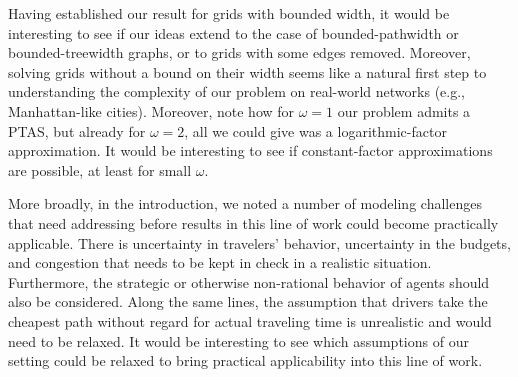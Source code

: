 Having established our result for grids with bounded width, it would be interesting to see if our ideas extend to the case of bounded-pathwidth or bounded-treewidth graphs, or to grids with some edges removed. Moreover, solving grids without a bound on their width seems like a natural first step to understanding the complexity of our problem on real-world networks (e.g., Manhattan-like cities). Moreover, note how for $\omega = 1$ our problem admits a PTAS, but already for $\omega = 2$, all we could give was a logarithmic-factor approximation. It would be interesting to see if constant-factor approximations are possible, at least for small $\omega$.

More broadly, in the introduction, we noted a number of modeling challenges that need addressing before results in this line of work could become practically applicable. There is uncertainty in travelers' behavior, uncertainty in the budgets, and congestion that needs to be kept in check in a realistic situation. Furthermore, the strategic or otherwise non-rational behavior of agents should also be considered. Along the same lines, the assumption that drivers take the cheapest path without regard for actual traveling time is unrealistic and would need to be relaxed. It would be interesting to see which assumptions of our setting could be relaxed to bring practical applicability into this line of work.